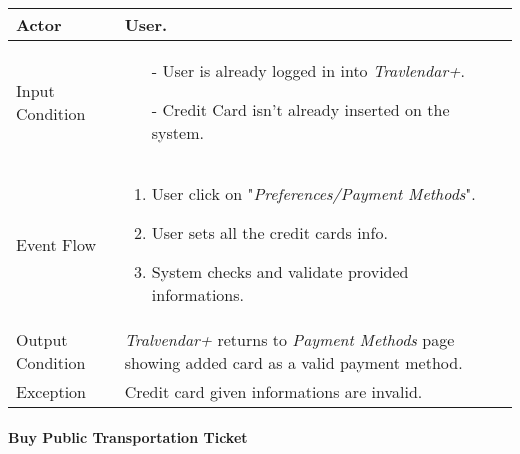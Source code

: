		\begin{tabular}{| l | p{} | }
			\hline
			\hline
			Actor	&		User. \\
			\hline
			Input Condition		&		\begin{itemize}
													\item[-] User is already logged in into \textit{Travlendar+}.
													\item[-] Credit Card isn't already inserted on the system.
												\end{itemize} \\
			\hline
			Event Flow		&		\begin{enumerate}
												\item User click on "\textit{Preferences/Payment Methods}".
												\item User sets all the credit cards info.
												\item System checks and validate provided informations.
											\end{enumerate} \\
			\hline
			Output Condition		&		\textit{Tralvendar+} returns to \textit{Payment Methods} page showing added card as a valid payment method. \\
			\hline		
			Exception		&		Credit card given informations are invalid. \\
			\hline
			\hline
		\end{tabular}


	\paragraph{Buy Public Transportation Ticket} \label{buyTicket_useCase}
	
